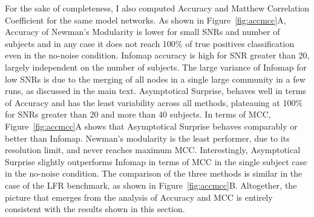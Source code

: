 For the sake of completeness, I also computed Accuracy and Matthew Correlation Coefficient for the same model networks.
As shown in Figure~\ref{fig:accmcc}A, Accuracy of Newman's Modularity is lower for small SNRs and number of subjects and in any case it does not reach 100\% of true positives classification even in the no-noise condition.
Infomap accuracy is high for SNR greater than 20, largely independent on the number of subjects.
The large variance of Infomap for low SNRs is due to the merging of all nodes in a single large community in a few runs, as discussed in the main text.
Asymptotical Surprise, behaves well in terms of Accuracy and has the least variability across all methods, plateauing at 100\% for SNRs greater than 20 and more than 40 subjects.
In terms of MCC, Figure~\ref{fig:accmcc}A shows that Asymptotical Surprise behaves comparably or better than Infomap.
Newman's modularity is the least performer, due to its resolution limit, and never reaches maximum MCC.
Interestingly, Asymptotical Surprise slightly outperforms Infomap in terms of MCC in the single subject case in the no-noise condition.
The comparison of the three methods is similar in the case of the LFR benchmark, as shown in Figure~\ref{fig:accmcc}B.
Altogether, the picture that emerges from the analysis of Accuracy and MCC is entirely consistent with the results shown in this section.



